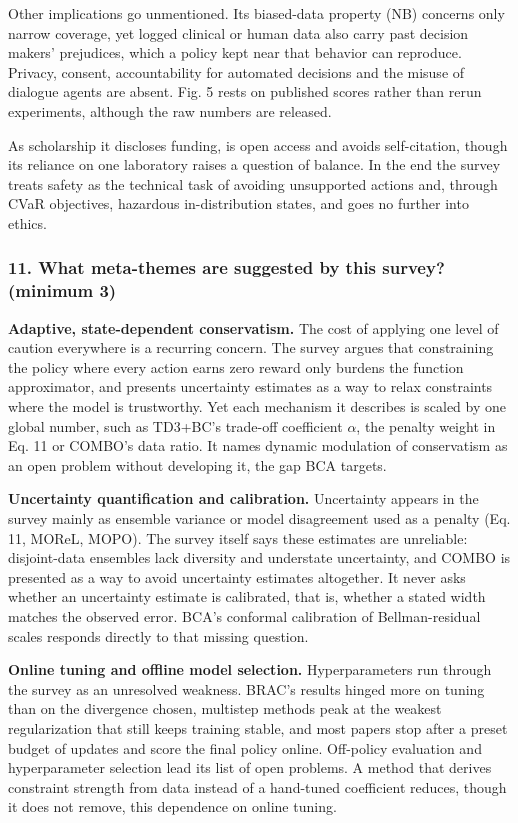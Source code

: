 \documentclass[11pt]{article}
\newcommand{\question}[1]{\subsubsection*{#1}}
\begin{document}
Other implications go unmentioned. Its biased-data property (NB) concerns only narrow coverage, yet logged clinical or human data also carry past decision makers' prejudices, which a policy kept near that behavior can reproduce. Privacy, consent, accountability for automated decisions and the misuse of dialogue agents are absent. Fig. 5 rests on published scores rather than rerun experiments, although the raw numbers are released.

As scholarship it discloses funding, is open access and avoids self-citation, though its reliance on one laboratory raises a question of balance. In the end the survey treats safety as the technical task of avoiding unsupported actions and, through CVaR objectives, hazardous in-distribution states, and goes no further into ethics.

\question{11. What meta-themes are suggested by this survey? (minimum 3)}

\textbf{Adaptive, state-dependent conservatism.} The cost of applying one level of caution everywhere is a recurring concern. The survey argues that constraining the policy where every action earns zero reward only burdens the function approximator, and presents uncertainty estimates as a way to relax constraints where the model is trustworthy. Yet each mechanism it describes is scaled by one global number, such as TD3+BC's trade-off coefficient \ensuremath{\alpha}, the penalty weight in Eq. 11 or COMBO's data ratio. It names dynamic modulation of conservatism as an open problem without developing it, the gap BCA targets.

\textbf{Uncertainty quantification and calibration.} Uncertainty appears in the survey mainly as ensemble variance or model disagreement used as a penalty (Eq. 11, MOReL, MOPO). The survey itself says these estimates are unreliable: disjoint-data ensembles lack diversity and understate uncertainty, and COMBO is presented as a way to avoid uncertainty estimates altogether. It never asks whether an uncertainty estimate is calibrated, that is, whether a stated width matches the observed error. BCA's conformal calibration of Bellman-residual scales responds directly to that missing question.

\textbf{Online tuning and offline model selection.} Hyperparameters run through the survey as an unresolved weakness. BRAC's results hinged more on tuning than on the divergence chosen, multistep methods peak at the weakest regularization that still keeps training stable, and most papers stop after a preset budget of updates and score the final policy online. Off-policy evaluation and hyperparameter selection lead its list of open problems. A method that derives constraint strength from data instead of a hand-tuned coefficient reduces, though it does not remove, this dependence on online tuning.
\end{document}

